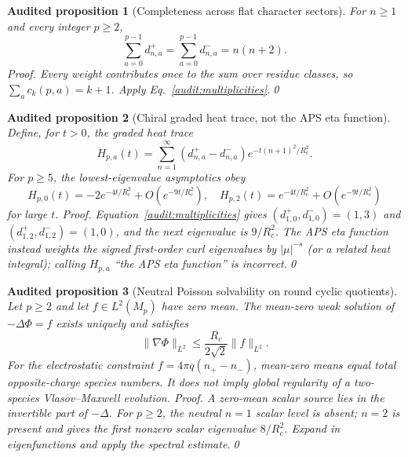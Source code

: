\documentclass[aps,prd,onecolumn,notitlepage,groupedaddress,11pt]{revtex4-2}
\newtheorem{auditprop}{Audited proposition}[section]
\begin{document}
\begin{auditprop}[Completeness across flat character sectors]\label{audit:sum}
For $n\ge1$ and every integer $p\ge2$,
\begin{equation}\label{audit:sumformula}
 \sum_{a=0}^{p-1}d^+_{n,a}=\sum_{a=0}^{p-1}d^-_{n,a}=n(n+2).
\end{equation}
\emph{Proof.} Every weight contributes once to the sum over residue classes, so $\sum_a c_k(p,a)=k+1$. Apply Eq.~\eqref{audit:multiplicities}.\qed
\end{auditprop}

\begin{auditprop}[Chiral graded heat trace, not the APS eta function]\label{audit:heat}
Define, for $t>0$, the \emph{graded heat trace}
\begin{equation}
 H_{p,a}(t)=\sum_{n=1}^{\infty}(d^+_{n,a}-d^-_{n,a})e^{-t(n+1)^2/R_c^2}.
\end{equation}
For $p\ge5$, the lowest-eigenvalue asymptotics obey
\begin{equation}\label{audit:heatlead}
 H_{p,0}(t)=-2e^{-4t/R_c^2}+O(e^{-9t/R_c^2}),\quad H_{p,2}(t)=e^{-4t/R_c^2}+O(e^{-9t/R_c^2})
\end{equation}
for large $t$. \emph{Proof.} Equation~\eqref{audit:multiplicities} gives $(d^+_{1,0},d^-_{1,0})=(1,3)$ and $(d^+_{1,2},d^-_{1,2})=(1,0)$, and the next eigenvalue is $9/R_c^2$. The APS eta function instead weights the \emph{signed first-order curl eigenvalues} by $|\mu|^{-s}$ (or a related heat integral); calling $H_{p,a}$ ``the APS eta function'' is incorrect.\qed
\end{auditprop}

\begin{auditprop}[Neutral Poisson solvability on round cyclic quotients]\label{audit:poisson}
Let $p\ge2$ and let $f\in L^2(M_p)$ have zero mean. The mean-zero weak solution of $-\Delta\Phi=f$ exists uniquely and satisfies
\begin{equation}\label{audit:poissonbound}
 \|\nabla\Phi\|_{L^2}\le \frac{R_c}{2\sqrt2}\|f\|_{L^2}.
\end{equation}
For the electrostatic constraint $f=4\pi q(n_+-n_-)$, mean-zero means equal \emph{total} opposite-charge species numbers. It does not imply global regularity of a two-species Vlasov--Maxwell evolution. \emph{Proof.} A zero-mean scalar source lies in the invertible part of $-\Delta$. For $p\ge2$, the neutral $n=1$ scalar level is absent; $n=2$ is present and gives the first nonzero scalar eigenvalue $8/R_c^2$. Expand in eigenfunctions and apply the spectral estimate.\qed
\end{auditprop}
\end{document}

